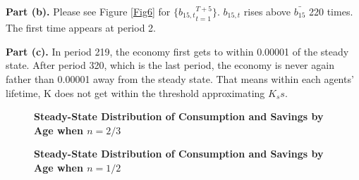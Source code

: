 \documentclass[letterpaper,12pt]{article}
\theoremstyle{definition}
\begin{document}
\noindent\textbf{Part (b).} Please see Figure \ref{Fig6} for $\{{b_{15,t}}_{t=1}^{T+5}\}$. $b_{15,t}$ rises above $\bar{b_15}$ 220 times. The first time appears at period 2. 

\noindent\textbf{Part (c).} In period 219, the economy first gets to within 0.00001 of the steady state. After period 320, which is the last period, the economy is never again father than 0.00001 away from the steady state. That means within each agents' lifetime, K does not get within the threshold approximating $K_ss$. 



\begin{figure}[htb]\centering
	\captionsetup{width=4.0in}
	\caption{\textbf{Steady-State Distribution of Consumption and Savings by Age when $n=2/3$}}
	\label{Fig1}
\end{figure}

\begin{figure}[htb]\centering
	\captionsetup{width=4.0in}
	\caption{\textbf{Steady-State Distribution of Consumption and Savings by Age when $n=1/2$}}
	\label{Fig2}
\end{figure}
\end{document}
